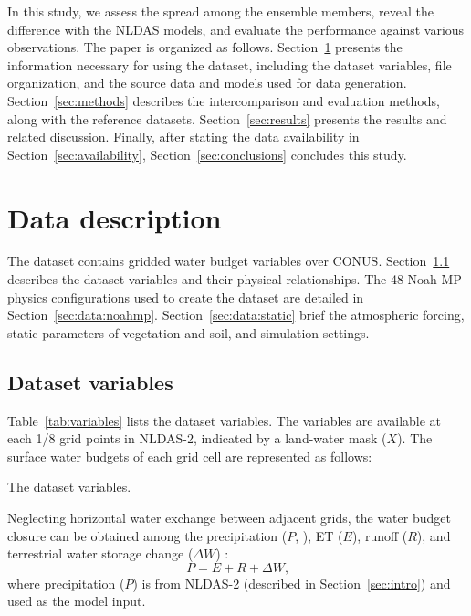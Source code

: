 \documentclass[essd, manuscript]{copernicus}
\let\unit\undefined
\begin{document}
In this study, we assess the spread among the ensemble members, reveal the difference with the NLDAS models, and evaluate the performance against various observations. The paper is organized as follows. Section~\ref{sec:data} presents the information necessary for using the dataset, including the dataset variables, file organization, and the source data and models used for data generation. Section~\ref{sec:methods} describes the intercomparison and evaluation methods, along with the reference datasets. Section~\ref{sec:results} presents the results and related discussion. Finally, after stating the data availability in Section~\ref{sec:availability}, Section~\ref{sec:conclusions} concludes this study.

\section{Data description}\label{sec:data}

The dataset contains gridded water budget variables over CONUS\@. Section~\ref{sec:data:variables} describes the dataset variables and their physical relationships. The 48 Noah-MP physics configurations used to create the dataset are detailed in Section~\ref{sec:data:noahmp}. Section~\ref{sec:data:static} brief the atmospheric forcing, static parameters of vegetation and soil, and simulation settings.

\subsection{Dataset variables}\label{sec:data:variables}

Table~\ref{tab:variables} lists the dataset variables. The variables are available at each 1/8\degree{} grid points in NLDAS-2, indicated by a land-water mask (\(X\)). The surface water budgets of each grid cell are represented as follows:

\begin{table}[t]
  \caption{The dataset variables.}
  \label{tab:variables}
  
\end{table}

Neglecting horizontal water exchange between adjacent grids, the water budget closure can be obtained among the precipitation (\(P\), \unit{kg.m^{-2}.s^{-1}}), ET (\(E\)), runoff (\(R\)), and terrestrial water storage change (\(\Delta W\)) \citep{zheng2020JAMES}:
\begin{equation}
  P = E + R + \Delta W
  \text{,}
\end{equation}
where precipitation (\(P\)) is from NLDAS-2 (described in Section~\ref{sec:intro}) and used as the model input.
\end{document}
